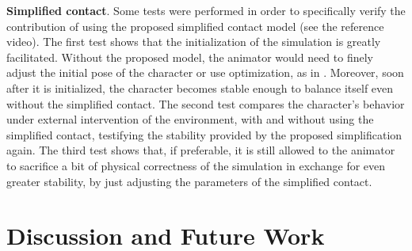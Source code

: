 \documentclass[tog]{acmsiggraph}
\begin{document}

\noindent \textbf{Simplified contact}. Some tests were performed in order to specifically verify the contribution of using the proposed simplified
contact model (see the reference video). The first test shows that the initialization of the simulation is greatly facilitated. Without the 
proposed model, the animator would need to finely adjust the initial pose of the character or use optimization, as in \cite{bib:Geijtenbeek12}. 
Moreover, soon after it is initialized, the character becomes stable enough to balance itself even without the simplified contact. The second 
test compares the character’s behavior under external intervention of the environment, with and without using the simplified contact, testifying
the stability provided by the proposed simplification again. The third test shows that, if preferable, it is still allowed to the animator to 
sacrifice a bit of physical correctness of the simulation in exchange for even greater stability, by just adjusting the parameters of the
simplified contact.

\section{Discussion and Future Work}
\end{document}
